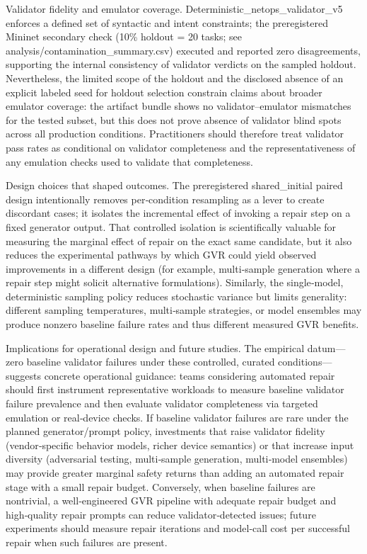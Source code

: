 \documentclass[conference]{IEEEtran}
\begin{document}
Validator fidelity and emulator coverage. Deterministic\_netops\_validator\_v5 enforces a defined set of syntactic and intent constraints; the preregistered Mininet secondary check (10\% holdout = 20 tasks; see analysis/contamination\_summary.csv) executed and reported zero disagreements, supporting the internal consistency of validator verdicts on the sampled holdout. Nevertheless, the limited scope of the holdout and the disclosed absence of an explicit labeled seed for holdout selection constrain claims about broader emulator coverage: the artifact bundle shows no validator--emulator mismatches for the tested subset, but this does not prove absence of validator blind spots across all production conditions. Practitioners should therefore treat validator pass rates as conditional on validator completeness and the representativeness of any emulation checks used to validate that completeness.

Design choices that shaped outcomes. The preregistered shared\_initial paired design intentionally removes per‑condition resampling as a lever to create discordant cases; it isolates the incremental effect of invoking a repair step on a fixed generator output. That controlled isolation is scientifically valuable for measuring the marginal effect of repair on the exact same candidate, but it also reduces the experimental pathways by which GVR could yield observed improvements in a different design (for example, multi‑sample generation where a repair step might solicit alternative formulations). Similarly, the single‑model, deterministic sampling policy reduces stochastic variance but limits generality: different sampling temperatures, multi‑sample strategies, or model ensembles may produce nonzero baseline failure rates and thus different measured GVR benefits.

Implications for operational design and future studies. The empirical datum---zero baseline validator failures under these controlled, curated conditions---suggests concrete operational guidance: teams considering automated repair should first instrument representative workloads to measure baseline validator failure prevalence and then evaluate validator completeness via targeted emulation or real‑device checks. If baseline validator failures are rare under the planned generator/prompt policy, investments that raise validator fidelity (vendor‑specific behavior models, richer device semantics) or that increase input diversity (adversarial testing, multi‑sample generation, multi‑model ensembles) may provide greater marginal safety returns than adding an automated repair stage with a small repair budget. Conversely, when baseline failures are nontrivial, a well‑engineered GVR pipeline with adequate repair budget and high‑quality repair prompts can reduce validator‑detected issues; future experiments should measure repair iterations and model‑call cost per successful repair when such failures are present.
\end{document}
